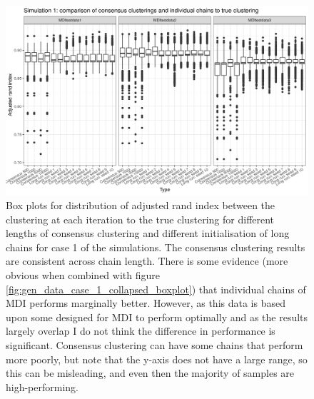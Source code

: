 \documentclass[12pt]{article} %
\begin{document}
		\begin{figure}
			\centering
			\includegraphics[scale=0.9]{Images/Gen_data/Case_1/box_plot_ari_true_clustering_burn_in.png}
			\caption{Box plots for distribution of adjusted rand index between the clustering at each iteration to the true clustering for different lengths of consensus clustering and different initialisation of long chains for case 1 of the simulations. The consensus clustering results are consistent across chain length. There is some evidence (more obvious when combined with figure \ref{fig:gen_data_case_1_collapsed_boxplot}) that individual chains of MDI performs marginally better. However, as this data is based upon some designed for MDI to perform optimally and as the results largely overlap I do not think the difference in performance is significant. Consensus clustering can have some chains that perform more poorly, but note that the y-axis does not have a large range, so this can be misleading, and even then the majority of samples are high-performing.}
			\label{fig:gen_data_case_1_boxplot}
		\end{figure}
		
		
\end{document}
